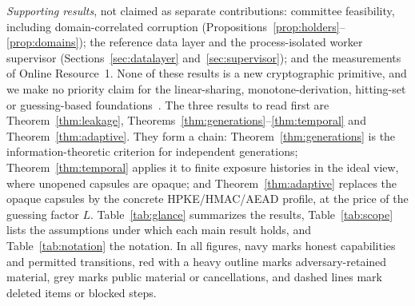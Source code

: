 \documentclass[pdflatex,sn-mathphys-num]{sn-jnl}%
\theoremstyle{plain}
\theoremstyle{definition}
\begin{document}
\emph{Supporting results}, not claimed as separate contributions: committee feasibility, including domain-correlated corruption (Propositions~\ref{prop:holders}--\ref{prop:domains}); the reference data layer and the process-isolated worker supervisor (Sections~\ref{sec:datalayer} and~\ref{sec:supervisor}); and the measurements of Online Resource~1. None of these results is a new cryptographic primitive, and we make no priority claim for the linear-sharing, monotone-derivation, hitting-set or guessing-based foundations~\cite{karchmer1993,panjwani2007}. The three results to read first are Theorem~\ref{thm:leakage}, Theorems~\ref{thm:generations}--\ref{thm:temporal} and Theorem~\ref{thm:adaptive}. They form a chain: Theorem~\ref{thm:generations} is the information-theoretic criterion for independent generations; Theorem~\ref{thm:temporal} applies it to finite exposure histories in the ideal view, where unopened capsules are opaque; and Theorem~\ref{thm:adaptive} replaces the opaque capsules by the concrete HPKE/HMAC/AEAD profile, at the price of the guessing factor $L$. Table~\ref{tab:glance} summarizes the results, Table~\ref{tab:scope} lists the assumptions under which each main result holds, and Table~\ref{tab:notation} the notation. In all figures, navy marks honest capabilities and permitted transitions, red with a heavy outline marks adversary-retained material, grey marks public material or cancellations, and dashed lines mark deleted items or blocked steps.
\end{document}
